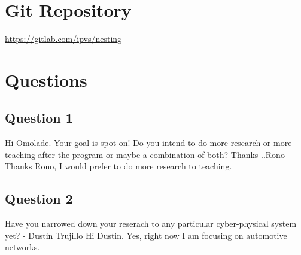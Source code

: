 \section{Git Repository}

\url{https://gitlab.com/ipvs/nesting}
\section{Questions}
\subsection{Question 1}

Hi Omolade. Your goal is spot on! Do you intend to do more research or more teaching after the program or maybe a combination of both? Thanks ..Rono
Thanks Rono, I would prefer to do more research to teaching.

\subsection{Question 2}
Have you narrowed down your reserach to any particular cyber-physical system yet? - Dustin Trujillo
Hi Dustin. Yes, right now I am focusing on automotive networks.

%
